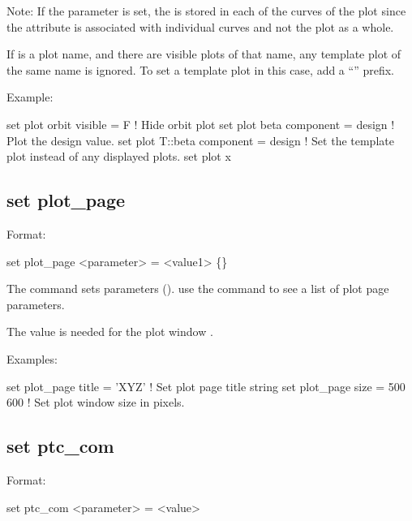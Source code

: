 {{{{{Note: If the  parameter is set, the  is stored in each of the curves of
the plot since the  attribute is associated with individual curves and not the plot as
a whole.

If  is a plot name, and there are visible plots of that name, any template plot
of the same name is ignored. To set a template plot in this case, add a ``'' prefix.

Example:
\begin{example}
  set plot orbit visible = F           ! Hide orbit plot
  set plot beta component = design     ! Plot the design value.
  set plot T::beta component = design  ! Set the template plot instead of any displayed plots.
  set plot x%
\end{example}


\subsection{set plot\_page}
\label{s:set.plot.page}

Format:
\begin{example}
  set plot_page <parameter> = <value1> \{<value2>\}
\end{example}

The  command sets  parameters ().
use the  command to see a list of plot page parameters.

The  value is needed for the plot window .

Examples:
\begin{example}
  set plot_page title = 'XYZ'  ! Set plot page title string
  set plot_page size = 500 600 ! Set plot window size in pixels.
\end{example}


\subsection{set ptc_com}
\label{s:set.ptc.com}

Format:
\begin{example}
  set ptc_com <parameter> = <value>
\end{example}

}}}}}
